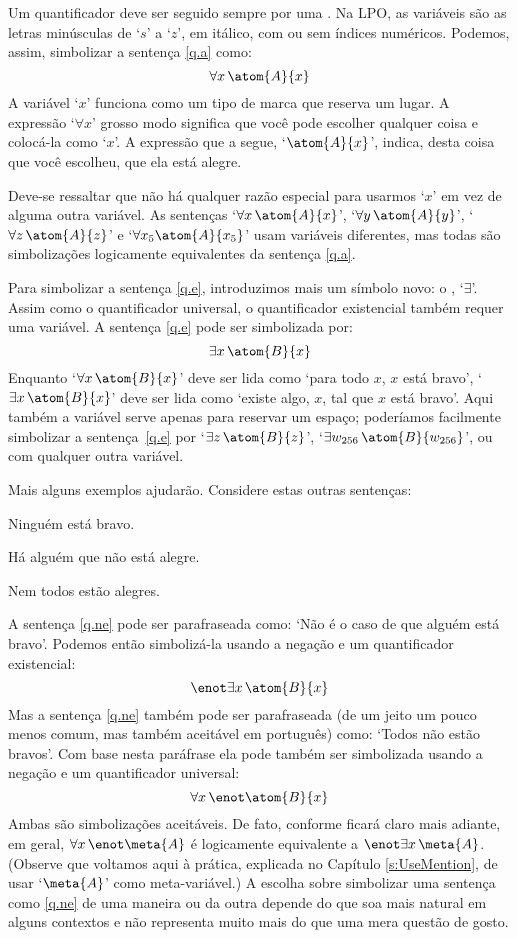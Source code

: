 Um quantificador deve ser seguido sempre por uma .
Na LPO, as variáveis são as letras minúsculas de `$s$' a `$z$', em itálico, com ou sem índices numéricos.
Podemos, assim, simbolizar a sentença \ref{q.a} como:
$$\forall x\, \atom{A}{x}$$
A variável `$x$' funciona como um tipo de marca que reserva um lugar.
A expressão `$\forall x$' grosso modo significa que você pode escolher qualquer coisa e colocá-la como `$x$'.
A expressão que a segue, `$\atom{A}{x}$', indica, desta coisa que você escolheu,  que ela está alegre.

Deve-se ressaltar que não há qualquer razão especial para usarmos `$x$' em vez de alguma outra variável.
As sentenças `$\forall x\, \atom{A}{x}$', `$\forall y\, \atom{A}{y}$', `$\forall z\, \atom{A}{z}$' e `$\forall x_5 \atom{A}{x_5}$' usam variáveis diferentes, mas todas são simbolizações logicamente equivalentes da sentença \ref{q.a}.

Para simbolizar a sentença \ref{q.e}, introduzimos mais um símbolo novo: o , `$\exists$'.
Assim como o quantificador universal, o quantificador existencial também requer uma variável.
A sentença \ref{q.e} pode ser simbolizada por:
$$\exists x\,\atom{B}{x}$$
Enquanto `$\forall x\,\atom{B}{x}$' deve ser lida como `para todo $x$, $x$ está bravo', `$\exists x\,\atom{B}{x}$' deve ser lida como `existe algo, $x$, tal que $x$ está bravo'.
Aqui também a variável serve apenas para reservar um espaço; poderíamos facilmente simbolizar a sentença~\ref{q.e} por `$\exists z\, \atom{B}{z}$', `$\exists w_{256}\, \atom{B}{w_{256}}$', ou com qualquer outra variável.


Mais alguns exemplos ajudarão. Considere estas outras sentenças:
	\begin{earg}
		\item[\ex{q.ne}] Ninguém está bravo.
		\item[\ex{q.en}] Há alguém que não está alegre.
		\item[\ex{q.na}] Nem todos estão alegres.
	\end{earg}
A sentença \ref{q.ne} pode ser parafraseada como:
`Não é o caso de que alguém está bravo'.
Podemos então simbolizá-la usando a negação e um quantificador existencial:
$$\enot \exists x\,\atom{B}{x}$$
Mas a sentença \ref{q.ne} também pode ser parafraseada (de um jeito um pouco menos comum, mas também aceitável em português) como:
`Todos não estão bravos'.
Com base nesta paráfrase ela pode também ser simbolizada usando a negação e um quantificador universal:
$$\forall x\, \enot \atom{B}{x}$$
Ambas são simbolizações aceitáveis.
De fato, conforme ficará claro mais adiante, em geral, $\forall x\, \enot\meta{A}$ é logicamente equivalente a $\enot\exists x\,\meta{A}$.
(Observe que voltamos aqui à prática, explicada no Capítulo \ref{s:UseMention}, de usar `$\meta{A}$' como meta-variável.)
A escolha sobre simbolizar uma sentença como \ref{q.ne} de uma maneira ou da outra depende do que soa mais natural em alguns contextos e  não representa muito mais do que uma mera questão de gosto.

